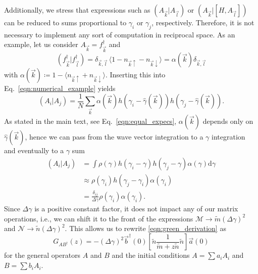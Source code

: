 \documentclass[
    reprint, 
    aps,
    preprintnumbers,
    twocolumn,
    prb,
    superscriptaddress
]{revtex4-2}
\newcommand{\vk}{\vec{k}}
\newcommand{\vl}{\vec{l}}
\newcommand{\dgamma}{\mathrm{d}\gamma}
\newcommand{\mM}{\mathcal{M}}
\newcommand{\mN}{\mathcal{N}}
\newcommand{\bs}{\begin{subequations}}
\newcommand{\es}{\end{subequations}}
\begin{document}
Additionally, we stress that expressions such as $(A_{\vk} | A_{\vl})$ or
$(A_{\vk} | [H, A_{\vl}])$ can be reduced to sums proportional to $\gamma_i$ or $\gamma_j$, respectively.
Therefore, it is not necessary to implement any sort of computation in reciprocal space.
As an example, let us consider $A_{\vk} = f_{\vk}^\dagger$ and 
\begin{equation}
    ( f_{\vk}^\dagger | f_{\vl}^\dagger ) = \delta_{\vk, \vl}\, \langle 1 - n_{\vk \uparrow} - n_{\vk \downarrow} \rangle = \alpha(\vk) \delta_{\vk, \vl}  
\end{equation}
with $\alpha(\vk)\coloneqq 1 - \langle n_{\vk \uparrow} + n_{\vk \downarrow} \rangle$. 
Inserting this into Eq.\ \eqref{eqn:numerical_example} yields
\begin{equation}
    (A_i | A_j) = \frac{1}{N} \sum_{\vk} \alpha(\vk) h(\gamma_i 
		- \widehat{\gamma}(\vk)) h(\gamma_j - \widehat{\gamma}(\vk)).
\end{equation}
As stated in the main text, see Eq.\ \eqref{eqn:equal_expecs}, $\alpha(\vk)$ depends only on $\widehat{\gamma}(\vk)$, 
hence we can pass from the wave vector integration to a $\gamma$ integration and eventually to a $\gamma$ sum
\bs
\begin{align}
    (A_i | A_j) &= \int \rho(\gamma) h(\gamma_i - \gamma) h(\gamma_j - \gamma) \alpha(\gamma) \dgamma 
      \\
    &\approx \rho(\gamma_i) h(\gamma_j - \gamma_i) \alpha(\gamma_i) 
			\\
    &= \frac{\delta_{ij}}{\Delta \gamma} \rho(\gamma_i) \alpha(\gamma_i).
\end{align}
\es
Since $\Delta \gamma$ is a positive constant factor, it does not impact any of our matrix operations, i.e., we can shift it to the front of the expressions $\mM \to \tilde{m} (\Delta \gamma)^2$ 
and $\mN \to \tilde{n} (\Delta \gamma)^2$.
This allows us to rewrite \eqref{eqn:green_derivation} as
\begin{equation}
    G_{AB^\dagger}(z) = - (\Delta \gamma)^2 \vec{b}^\dagger (0) \left[ \tilde{n} \frac{1}{\tilde{m} + z \tilde{n}} \tilde{n} \right] \vec{a}(0)
\end{equation}
for the general operators $A$ and $B$ and the initial conditions
$A=\sum a_i A_i$ and $B=\sum b_i A_i$.
\end{document}
